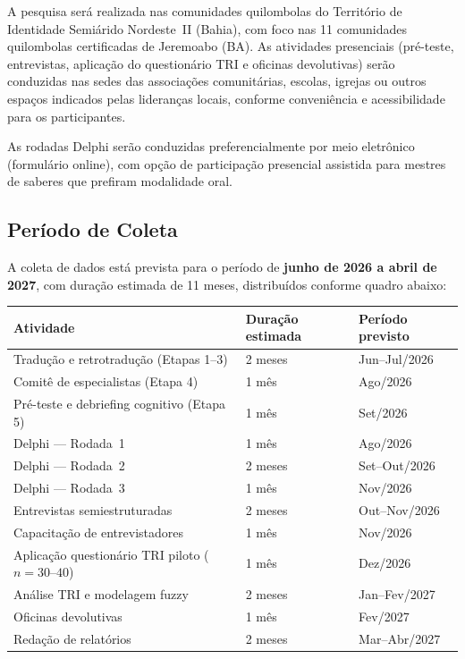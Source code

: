 \documentclass[12pt,a4paper,brazil]{article}
\begin{document}
A pesquisa será realizada nas comunidades quilombolas do Território de Identidade Semiárido Nordeste~II (Bahia), com foco nas 11 comunidades quilombolas certificadas de Jeremoabo (BA). As atividades presenciais (pré-teste, entrevistas, aplicação do questionário TRI e oficinas devolutivas) serão conduzidas nas sedes das associações comunitárias, escolas, igrejas ou outros espaços indicados pelas lideranças locais, conforme conveniência e acessibilidade para os participantes.

As rodadas Delphi serão conduzidas preferencialmente por meio eletrônico (formulário online), com opção de participação presencial assistida para mestres de saberes que prefiram modalidade oral.

\subsection{Período de Coleta}

A coleta de dados está prevista para o período de \textbf{junho de 2026 a abril de 2027}, com duração estimada de 11 meses, distribuídos conforme quadro abaixo:

\begin{longtable}{p{6cm}p{3cm}p{4cm}}
\toprule
\textbf{Atividade} & \textbf{Duração estimada} & \textbf{Período previsto} \\
\midrule
\endhead
Tradução e retrotradução (Etapas 1--3) & 2 meses & Jun--Jul/2026 \\
Comitê de especialistas (Etapa 4) & 1 mês & Ago/2026 \\
Pré-teste e debriefing cognitivo (Etapa 5) & 1 mês & Set/2026 \\
Delphi --- Rodada~1 & 1 mês & Ago/2026 \\
Delphi --- Rodada~2 & 2 meses & Set--Out/2026 \\
Delphi --- Rodada~3 & 1 mês & Nov/2026 \\
Entrevistas semiestruturadas & 2 meses & Out--Nov/2026 \\
Capacitação de entrevistadores & 1 mês & Nov/2026 \\
Aplicação questionário TRI piloto ($n=30$--$40$) & 1 mês & Dez/2026 \\
Análise TRI e modelagem fuzzy & 2 meses & Jan--Fev/2027 \\
Oficinas devolutivas & 1 mês & Fev/2027 \\
Redação de relatórios & 2 meses & Mar--Abr/2027 \\
\bottomrule
\end{longtable}
\end{document}
